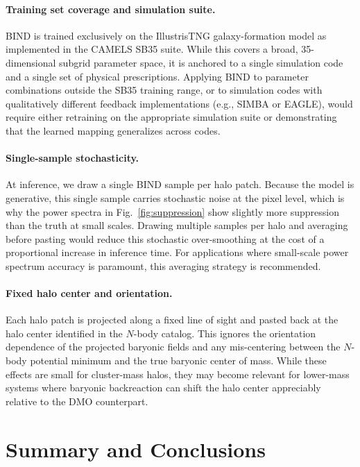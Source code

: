 \documentclass[linenumbers,trackchanges, twocolumn]{aastex701}
\begin{document}
\paragraph{Training set coverage and simulation suite.} \textsc{BIND} is trained exclusively on the IllustrisTNG galaxy-formation model as implemented in the CAMELS SB35 suite. While this covers a broad, 35-dimensional subgrid parameter space, it is anchored to a single simulation code and a single set of physical prescriptions. Applying \textsc{BIND} to parameter combinations outside the SB35 training range, or to simulation codes with qualitatively different feedback implementations (e.g., SIMBA or EAGLE), would require either retraining on the appropriate simulation suite or demonstrating that the learned mapping generalizes across codes.

\paragraph{Single-sample stochasticity.} At inference, we draw a single \textsc{BIND} sample per halo patch. Because the model is generative, this single sample carries stochastic noise at the pixel level, which is why the power spectra in Fig.~\ref{fig:suppression} show slightly more suppression than the truth at small scales. Drawing multiple samples per halo and averaging before pasting would reduce this stochastic over-smoothing at the cost of a proportional increase in inference time. For applications where small-scale power spectrum accuracy is paramount, this averaging strategy is recommended.

\paragraph{Fixed halo center and orientation.} Each halo patch is projected along a fixed line of sight and pasted back at the halo center identified in the $N$-body catalog. This ignores the orientation dependence of the projected baryonic fields and any mis-centering between the $N$-body potential minimum and the true baryonic center of mass. While these effects are small for cluster-mass halos, they may become relevant for lower-mass systems where baryonic backreaction can shift the halo center appreciably relative to the DMO counterpart.


\section{Summary and Conclusions}
\label{sec:conclusions}
\end{document}

